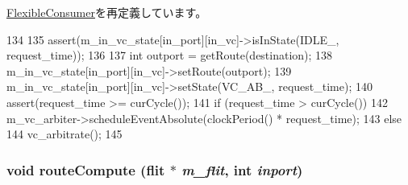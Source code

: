 \hyperlink{classFlexibleConsumer_aa0ffe58ceb5a05129736d59f3eeabcf0}{FlexibleConsumer}を再定義しています。


\begin{DoxyCode}
134 {
135     assert(m_in_vc_state[in_port][in_vc]->isInState(IDLE_, request_time));
136 
137     int outport = getRoute(destination);
138     m_in_vc_state[in_port][in_vc]->setRoute(outport);
139     m_in_vc_state[in_port][in_vc]->setState(VC_AB_, request_time);
140     assert(request_time >= curCycle());
141     if (request_time > curCycle())
142         m_vc_arbiter->scheduleEventAbsolute(clockPeriod() * request_time);
143     else
144         vc_arbitrate();
145 }
\end{DoxyCode}
\hypertarget{classRouter_aeb1ad1b60d443efcb72a73917e20bbd1}{
\subsubsection[{routeCompute}]{\setlength{\rightskip}{0pt plus 5cm}void routeCompute ({\bf flit} $\ast$ {\em m\_\-flit}, \/  int {\em inport})}}
\label{classRouter_aeb1ad1b60d443efcb72a73917e20bbd1}



